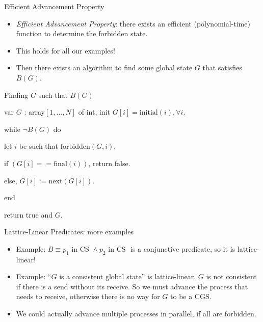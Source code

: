 \documentclass{beamer}
\begin{document}
\begin{frame}{Efficient Advancement Property}
\begin{itemize}
    \item \emph{Efficient Advancement Property}: there exists
    an efficient (polynomial-time) function to determine the forbidden
    state.
    \item This holds for all our examples!
    \item Then there exists an algorithm to find some global state $G$
    that satisfies $B(G)$.
\end{itemize}
\end{frame}

\begin{frame}{Finding $G$ such that $B(G)$}
    \begin{framed}
var $G$ : array$[1, ..., N]$ of int, init $G[i] = \mathrm{initial}(i), \forall i$.
\vskip12pt

while $\neg B(G)$ do

\hskip12pt let $i$ be such that $\mathrm{forbidden}(G, i)$.
    
\hskip12pt if $(G[i] == \mathrm{final}(i))$, return false.
    
\hskip12pt else, $G[i] := \mathrm{next}(G[i])$.

end

return true and $G$.

    \end{framed}
\end{frame}

\begin{frame}{Lattice-Linear Predicates: more examples}
    
    \begin{itemize}
        \item Example: $B \equiv p_1 \textrm{ in CS } \wedge p_2 \textrm{ in CS }$
        is a conjunctive predicate, so it is lattice-linear!
        \item Example: ``$G$ is a consistent global state'' is lattice-linear.
        $G$ is not consistent if there is a send without its receive.
        So we must advance the process that needs to receive,
        otherwise there is no way for $G$ to be a CGS.
        \item We could actually advance multiple processes in parallel, if
        all are forbidden.
    \end{itemize}
    
\end{frame}
\end{document}
